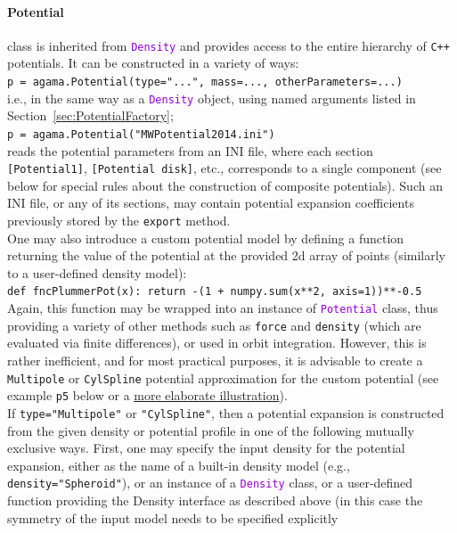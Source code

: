 \documentclass[12pt]{article}
\newcommand{\Cpp}  {\texttt{C++}\xspace}
\newcommand{\ttt}[1]{\textcolor{darkviolet}{\texttt{#1}}}
\newcommand{\ppp}[1]{\textcolor{darkolive} {\texttt{#1}}}
\begin{document}
\paragraph{Potential} \label{sec:PythonPotential} class is inherited from \ttt{Density} and provides access to the entire hierarchy of \Cpp potentials. It can be constructed in a variety of ways: \\
\texttt{p = agama.Potential(type="...", mass=..., otherParameters=...)}\\
i.e., in the same way as a \ttt{Density} object, using named arguments listed in Section~\ref{sec:PotentialFactory};\\
\texttt{p = agama.Potential("MWPotential2014.ini")}\\
reads the potential parameters from an INI file, where each section \ppp{[Potential1]}, \ppp{[Potential disk]}, etc., corresponds to a single component (see below for special rules about the construction of composite potentials). Such an INI file, or any of its sections, may contain potential expansion coefficients previously stored by the \texttt{export} method. \\[2mm]
One may also introduce a custom potential model by defining a function returning the value of the potential at the provided 2d array of points (similarly to a user-defined density model):\\
\texttt{def fncPlummerPot(x): return -(1 + numpy.sum(x**2, axis=1))**-0.5}\\[1mm]
Again, this function may be wrapped into an instance of \ttt{Potential} class, thus providing a variety of other methods such as \texttt{force} and \texttt{density} (which are evaluated via finite differences), or used in orbit integration. However, this is rather inefficient, and for most practical purposes, it is advisable to create a \ppp{Multipole} or \ppp{CylSpline} potential approximation for the custom potential (see example \texttt{p5} below or a \hyperref[sec:ExampleSpiral]{more elaborate illustration}).\\[2mm]
If \ppp{type="Multipole"} or \ppp{"CylSpline"}, then a potential expansion is constructed from the given density or potential profile in one of the following mutually exclusive ways.
First, one may specify the input density for the potential expansion, either as the name of a built-in density model (e.g., \ppp{density="Spheroid"}), or an instance of a \ttt{Density} class, or a user-defined function providing the Density interface as described above (in this case the symmetry of the input model needs to be specified explicitly%
\end{document}
